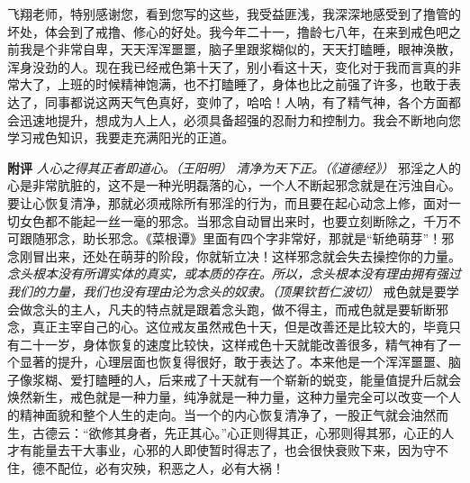 \begin{case}
    飞翔老师，特别感谢您，看到您写的这些，我受益匪浅，我深深地感受到了撸管的坏处，体会到了戒撸、修心的好处。我今年二十一，撸龄七八年，在来到戒色吧之前我是个非常自卑，天天浑浑噩噩，脑子里跟浆糊似的，天天打瞌睡，眼神涣散，浑身没劲的人。现在我已经戒色第十天了，别小看这十天，变化对于我而言真的非常大了，上班的时候精神饱满，也不打瞌睡了，身体也比之前强了许多，也敢于表达了，同事都说这两天气色真好，变帅了，哈哈！人呐，有了精气神，各个方面都会迅速地提升，想成为人上人，必须具备超强的忍耐力和控制力。我会不断地向您学习戒色知识，我要走充满阳光的正道。

    \textbf{附评} \textit{人心之得其正者即道心。（王阳明）} \textit{清净为天下正。（《道德经》）} 邪淫之人的心是非常肮脏的，这不是一种光明磊落的心，一个人不断起邪念就是在污浊自心。要让心恢复清净，那就必须戒除所有邪淫的行为，而且要在起心动念上修，面对一切女色都不能起一丝一毫的邪念。当邪念自动冒出来时，也要立刻断除之，千万不可跟随邪念，助长邪念。《菜根谭》里面有四个字非常好，那就是“斩绝萌芽”！邪念刚冒出来，还处在萌芽的阶段，你就斩立决！这样邪念就会失去操控你的力量。\textit{念头根本没有所谓实体的真实，或本质的存在。所以，念头根本没有理由拥有强过我们的力量，我们也没有理由沦为念头的奴隶。（顶果钦哲仁波切）} 戒色就是要学会做念头的主人，凡夫的特点就是跟着念头跑，做不得主，而戒色就是要斩断邪念，真正主宰自己的心。这位戒友虽然戒色十天，但是改善还是比较大的，毕竟只有二十一岁，身体恢复的速度比较快，这样戒色十天就能改善很多，精气神有了一个显著的提升，心理层面也恢复得很好，敢于表达了。本来他是一个浑浑噩噩、脑子像浆糊、爱打瞌睡的人，后来戒了十天就有一个崭新的蜕变，能量值提升后就会焕然新生，戒色就是一种力量，纯净就是一种力量，这种力量完全可以改变一个人的精神面貌和整个人生的走向。当一个的内心恢复清净了，一股正气就会油然而生，古德云：“欲修其身者，先正其心。”心正则得其正，心邪则得其邪，心正的人才有能量去干大事业，心邪的人即使暂时得志了，也会很快衰败下来，因为守不住，德不配位，必有灾殃，积恶之人，必有大祸！
\end{case}

